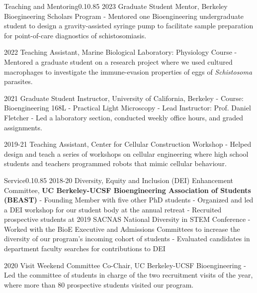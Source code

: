 \documentclass{federico_cv}
\begin{document}
\begin{tblSection}{Teaching and Mentoring}{0.1}{0.85}
\leftbfrightsingle
{2023}
{Graduate Student Mentor, Berkeley Bioegineering Scholars Program}
{- Mentored one Bioengineering undergraduate student to design a gravity-assisted syringe pump to facilitate sample preparation for point-of-care diagnostics of schistosomiasis.}

\leftbfrightsingle
{2022}
{Teaching Assistant, Marine Biological Laboratory: Physiology Course}
{- Mentored a graduate student on a research project where we used cultured macrophages to investigate the immune-evasion properties of eggs of \textit{Schistosoma} parasites.}


\leftbfrightsingle
{2021}
{Graduate Student Instructor, University of California, Berkeley}
{- Course: Bioengineering 168L - Practical Light Microscopy}
{- Lead Instructor: Prof. Daniel Fletcher}
{- Led a laboratory section, conducted weekly office hours, and graded assignments.}

\leftbfrightsingle
{2019-21}
{Teaching Assistant, Center for Cellular Construction Workshop}
{- Helped design and teach a series of workshops on cellular engineering where high school students and teachers programmed robots that mimic cellular behaviour.}

\end{tblSection}




\begin{tblSection}{Service}{0.1}{0.85}
\leftbfrightsingle
{2018-20}
{Diversity, Equity and Inclusion (DEI) Enhancement Committee,}
{\textbf{UC Berkeley-UCSF Bioengineering Association of Students (BEAST)}}
{- Founding Member with five other PhD students}
{- Organized and led a DEI workshop for our student body at the annual retreat}
{- Recruited prospective students at 2019 SACNAS National Diversity in STEM Conference}
{- Worked with the BioE Executive and Admissions Committees to increase the diversity of our program's incoming cohort of students}
{- Evaluated candidates in department faculty searches for contributions to DEI}

\leftbfrightsingle
{2020}
{Visit Weekend Committee Co-Chair, UC Berkeley-UCSF Bioengineering}
{- Led the committee of students in charge of the two recruitment visits of the year, where more than 80 prospective students visited our program.}

\end{tblSection}
\end{document}
